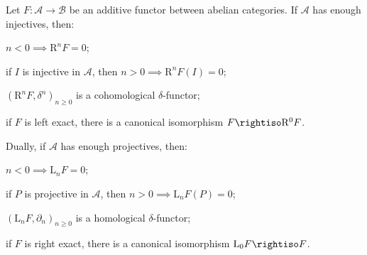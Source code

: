 \begin{proposition}\label{prop:derived-primer-long}
	Let $F:\mathcal{A}\to\mathcal{B}$ be an additive functor between abelian
	categories. If $\mathcal{A}$ has enough injectives, then:
	\begin{compactitem}
		\item $n<0\implies\mathrm{R}^nF=0$;
		\item if $I$ is injective in $\mathcal{A}$, then
		$n>0\implies\mathrm{R}^nF(I)=0$;
		\item $(\mathrm{R}^nF,\delta^n)_{n\geq0}$ is a cohomological
		$\delta$-functor;
		\item if $F$ is left exact, there is a canonical isomorphism
		$F\rightiso\mathrm{R}^0F$.
	\end{compactitem}
	Dually, if $\mathcal{A}$ has enough projectives, then:
	\begin{compactitem}
		\item $n<0\implies\mathrm{L}_nF=0$;
		\item if $P$ is projective in $\mathcal{A}$, then
		$n>0\implies\mathrm{L}_nF(P)=0$;
		\item $(\mathrm{L}_nF,\partial_n)_{n\geq0}$ is a homological
		$\delta$-functor;
		\item if $F$ is right exact, there is a canonical isomorphism
		$\mathrm{L}_0F\rightiso F$.
	\end{compactitem}
\end{proposition}
